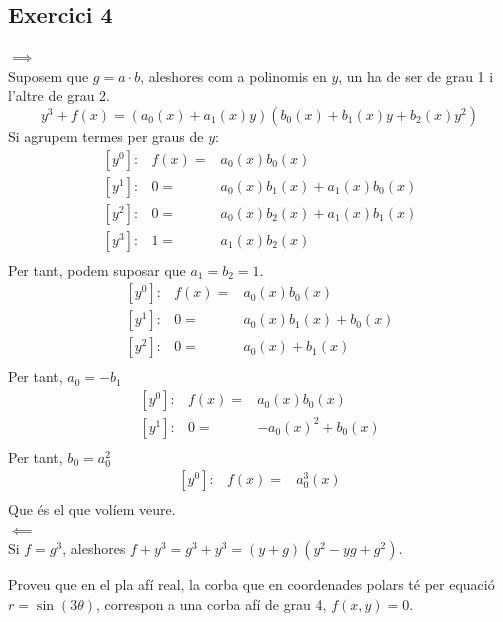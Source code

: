 \documentclass[11pt, a4paper]{article}
\begin{document}
\subsection{Exercici 4}
\textbf{$\implies$}\\
Suposem que $g=a\cdot b$, aleshores com a polinomis en $y$, un ha de ser de grau 1 i l'altre de grau 2.
\[
    y^3+f(x)=(a_0(x)+a_1(x)y)(b_0(x) + b_1(x) y+b_2(x) y^2)
\]
Si agrupem termes per graus de $y$:
\[
\begin{array}{lrl}
    {[y^0]}: & f(x) = & a_0(x)b_0(x)\\
    {[y^1]}: & 0 =    & a_0(x)b_1(x) + a_1(x)b_0(x)\\
    {[y^2]}: & 0 = &a_0(x)b_2(x)+a_1(x)b_1(x)\\ 
    {[y^3]}: & 1 = &a_1(x)b_2(x)\\ 
\end{array}
\]
Per tant, podem suposar que $a_1 = b_2 = 1$.
\[
\begin{array}{lrl}
    {[y^0]}: & f(x) = & a_0(x)b_0(x)\\
    {[y^1]}: & 0 =    & a_0(x)b_1(x) + b_0(x)\\
    {[y^2]}: & 0 = &a_0(x)+b_1(x)\\ 
\end{array}
\]
Per tant, $a_0=-b_1$
\[
\begin{array}{lrl}
    {[y^0]}: & f(x) = & a_0(x)b_0(x)\\
    {[y^1]}: & 0 =    & -a_0(x)^2 + b_0(x)\\
\end{array}
\]
Per tant, $b_0=a_0^2$
\[
\begin{array}{lrl}
    {[y^0]}: & f(x) = & a_0^3(x)\\
\end{array}
\]
Que és el que volíem veure.\\
\textbf{$\impliedby$}\\
Si $f = g^3$, aleshores $f+y^3 = g^3+y^3 = (y+g)(y^2-yg+g^2)$.
\newpage
\begin{tcolorbox}[title=\section{Exercici 5}]
    Proveu que en el pla afí real, la corba que en coordenades polars té per equació $r=\sin(3\theta)$, correspon a una corba afí de grau 4, $f(x,y) = 0$.
\end{tcolorbox}
\end{document}
